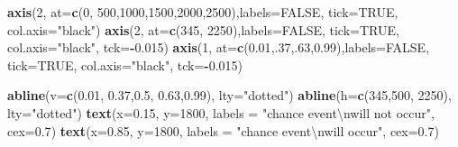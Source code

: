 \documentclass[12pt,oneside]{reedthesis}
\newenvironment{Shaded}{\begin{snugshade}}{\end{snugshade}}
\newcommand{\CharTok}[1]{\textcolor[rgb]{0.31,0.60,0.02}{#1}}
\newcommand{\DataTypeTok}[1]{\textcolor[rgb]{0.13,0.29,0.53}{#1}}
\newcommand{\DecValTok}[1]{\textcolor[rgb]{0.00,0.00,0.81}{#1}}
\newcommand{\FloatTok}[1]{\textcolor[rgb]{0.00,0.00,0.81}{#1}}
\newcommand{\KeywordTok}[1]{\textcolor[rgb]{0.13,0.29,0.53}{\textbf{#1}}}
\newcommand{\NormalTok}[1]{#1}
\newcommand{\OperatorTok}[1]{\textcolor[rgb]{0.81,0.36,0.00}{\textbf{#1}}}
\newcommand{\OtherTok}[1]{\textcolor[rgb]{0.56,0.35,0.01}{#1}}
\newcommand{\StringTok}[1]{\textcolor[rgb]{0.31,0.60,0.02}{#1}}
\begin{document}
\begin{Shaded}
\begin{Highlighting}[]
\KeywordTok{axis}\NormalTok{(}\DecValTok{2}\NormalTok{, }\DataTypeTok{at=}\KeywordTok{c}\NormalTok{(}\DecValTok{0}\NormalTok{, }\DecValTok{500}\NormalTok{,}\DecValTok{1000}\NormalTok{,}\DecValTok{1500}\NormalTok{,}\DecValTok{2000}\NormalTok{,}\DecValTok{2500}\NormalTok{),}\DataTypeTok{labels=}\OtherTok{FALSE}\NormalTok{, }\DataTypeTok{tick=}\OtherTok{TRUE}\NormalTok{, }\DataTypeTok{col.axis=}\StringTok{"black"}\NormalTok{)}
\KeywordTok{axis}\NormalTok{(}\DecValTok{2}\NormalTok{, }\DataTypeTok{at=}\KeywordTok{c}\NormalTok{(}\DecValTok{345}\NormalTok{, }\DecValTok{2250}\NormalTok{),}\DataTypeTok{labels=}\OtherTok{FALSE}\NormalTok{, }\DataTypeTok{tick=}\OtherTok{TRUE}\NormalTok{, }\DataTypeTok{col.axis=}\StringTok{"black"}\NormalTok{, }\DataTypeTok{tck=}\OperatorTok{-}\FloatTok{0.015}\NormalTok{)}
\KeywordTok{axis}\NormalTok{(}\DecValTok{1}\NormalTok{, }\DataTypeTok{at=}\KeywordTok{c}\NormalTok{(}\FloatTok{0.01}\NormalTok{,.}\DecValTok{37}\NormalTok{,.}\DecValTok{63}\NormalTok{,}\FloatTok{0.99}\NormalTok{),}\DataTypeTok{labels=}\OtherTok{FALSE}\NormalTok{, }\DataTypeTok{tick=}\OtherTok{TRUE}\NormalTok{, }\DataTypeTok{col.axis=}\StringTok{"black"}\NormalTok{, }\DataTypeTok{tck=}\OperatorTok{-}\FloatTok{0.015}\NormalTok{)}

\KeywordTok{abline}\NormalTok{(}\DataTypeTok{v=}\KeywordTok{c}\NormalTok{(}\FloatTok{0.01}\NormalTok{, }\FloatTok{0.37}\NormalTok{,}\FloatTok{0.5}\NormalTok{, }\FloatTok{0.63}\NormalTok{,}\FloatTok{0.99}\NormalTok{), }\DataTypeTok{lty=}\StringTok{"dotted"}\NormalTok{)}
\KeywordTok{abline}\NormalTok{(}\DataTypeTok{h=}\KeywordTok{c}\NormalTok{(}\DecValTok{345}\NormalTok{,}\DecValTok{500}\NormalTok{, }\DecValTok{2250}\NormalTok{), }\DataTypeTok{lty=}\StringTok{"dotted"}\NormalTok{)}
\KeywordTok{text}\NormalTok{(}\DataTypeTok{x=}\FloatTok{0.15}\NormalTok{,  }\DataTypeTok{y=}\DecValTok{1800}\NormalTok{, }\DataTypeTok{labels =} \StringTok{"chance event}\CharTok{\textbackslash{}n}\StringTok{will not occur"}\NormalTok{, }\DataTypeTok{cex=}\FloatTok{0.7}\NormalTok{)}
\KeywordTok{text}\NormalTok{(}\DataTypeTok{x=}\FloatTok{0.85}\NormalTok{,  }\DataTypeTok{y=}\DecValTok{1800}\NormalTok{, }\DataTypeTok{labels =} \StringTok{"chance event}\CharTok{\textbackslash{}n}\StringTok{will occur"}\NormalTok{, }\DataTypeTok{cex=}\FloatTok{0.7}\NormalTok{)}
\end{Highlighting}
\end{Shaded}
\normalsize
\end{document}

